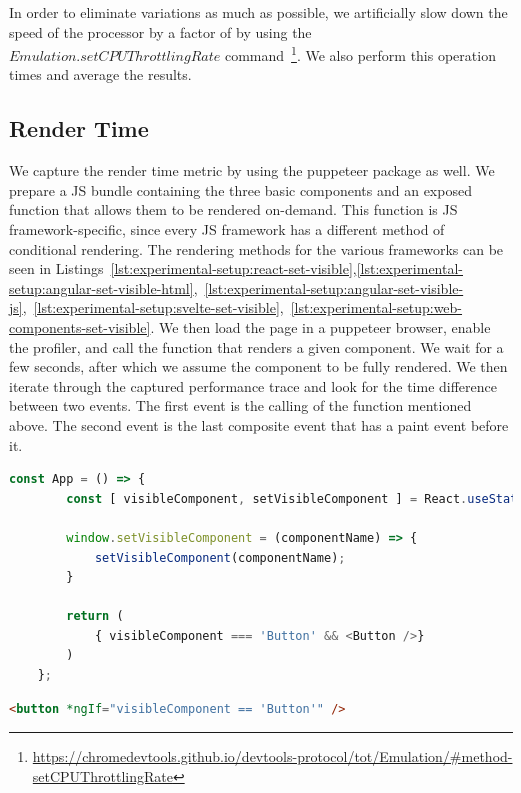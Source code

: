 
In order to eliminate variations as much as possible, we artificially slow down the speed of the processor by a factor of \slowdownFactorLoadTime{} by using the \(Emulation.setCPUThrottlingRate\) command~\footnote{\url{https://chromedevtools.github.io/devtools-protocol/tot/Emulation/\#method-setCPUThrottlingRate}}. We also perform this operation \loadTimePerformanceMeasures{} times and average the results.

\subsection{Render Time}
We capture the render time metric by using the puppeteer package as well. We prepare a JS bundle containing the three basic components and an exposed function that allows them to be rendered on-demand. This function is JS framework-specific, since every JS framework has a different method of conditional rendering. The rendering methods for the various frameworks can be seen in Listings~\ref{lst:experimental-setup:react-set-visible},\ref{lst:experimental-setup:angular-set-visible-html},~\ref{lst:experimental-setup:angular-set-visible-js},~\ref{lst:experimental-setup:svelte-set-visible},~\ref{lst:experimental-setup:web-components-set-visible}. We then load the page in a puppeteer browser, enable the profiler, and call the function that renders a given component. We wait for a few seconds, after which we assume the component to be fully rendered. We then iterate through the captured performance trace and look for the time difference between two events. The first event is the calling of the function mentioned above. The second event is the last composite event that has a paint event before it.

\begin{lstlisting}[language={JavaScript},caption={The render-on-demand function in ReactJS},label={lst:experimental-setup:react-set-visible}]
	const App = () => {
		const [ visibleComponent, setVisibleComponent ] = React.useState(null);
	
		window.setVisibleComponent = (componentName) => {
			setVisibleComponent(componentName);
		}

		return (
			{ visibleComponent === 'Button' && <Button />}
		)
	};
\end{lstlisting}

\begin{lstlisting}[language={HTML},caption={The render-on-demand function in Angular (HTML file)},label={lst:experimental-setup:angular-set-visible-html}]
	<button *ngIf="visibleComponent == 'Button'" />
\end{lstlisting}

